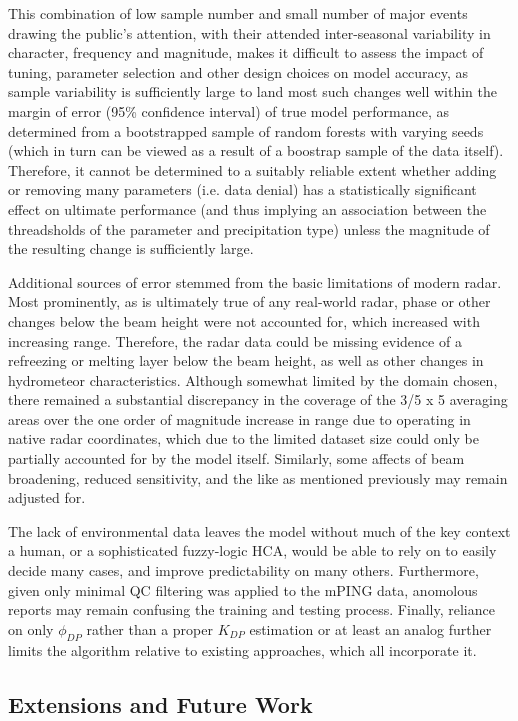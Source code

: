 \documentclass{agujournal}
\begin{document}
This combination of low sample number and small number of major events drawing the public's attention, with their attended inter-seasonal variability in character, frequency and magnitude, makes it difficult to assess the impact of tuning, parameter selection and other design choices on model accuracy, as sample variability is sufficiently large to land most such changes well within the margin of error (95\% confidence interval) of true model performance, as determined from a bootstrapped sample of random forests with varying seeds (which in turn can be viewed as a result of a boostrap sample of the data itself). Therefore, it cannot be determined to a suitably reliable extent whether adding or removing many parameters (i.e. data denial) has a statistically significant effect on ultimate performance (and thus implying an association between the threadsholds of the parameter and precipitation type) unless the magnitude of the resulting change is sufficiently large.

Additional sources of error stemmed from the basic limitations of modern radar. Most prominently, as is ultimately true of any real-world radar, phase or other changes below the beam height were not accounted for, which increased with increasing range. Therefore, the radar data could be missing evidence of a refreezing or melting layer below the beam height, as well as other changes in hydrometeor characteristics. Although somewhat limited by the domain chosen, there remained a substantial discrepancy in the coverage of the 3/5 x 5 averaging areas over the one order of magnitude increase in range due to operating in native radar coordinates, which due to the limited dataset size could only be partially accounted for by the model itself. Similarly, some affects of beam broadening, reduced sensitivity, and the like as mentioned previously may remain adjusted for. 

The lack of environmental data leaves the model without much of the key context a human, or a sophisticated fuzzy-logic HCA, would be able to rely on to easily decide many cases, and improve predictability on many others. Furthermore, given only minimal QC filtering was applied to the mPING data, anomolous reports may remain confusing the training and testing process. Finally, reliance on only $\phi_{DP}$ rather than a proper $K_{DP}$ estimation or at least an analog further limits the algorithm relative to existing approaches, which all incorporate it.



\subsection{Extensions and Future Work}
\end{document}

